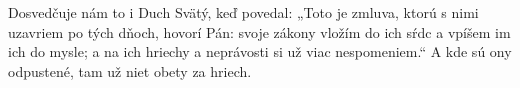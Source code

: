 Dosvedčuje nám to i Duch Svätý, keď povedal:
„Toto je zmluva, ktorú s nimi uzavriem po tých dňoch, hovorí Pán: svoje zákony vložím do ich sŕdc a vpíšem im ich do mysle;
a na ich hriechy a neprávosti si už viac nespomeniem.“
A kde sú ony odpustené, tam už niet obety za hriech. 
